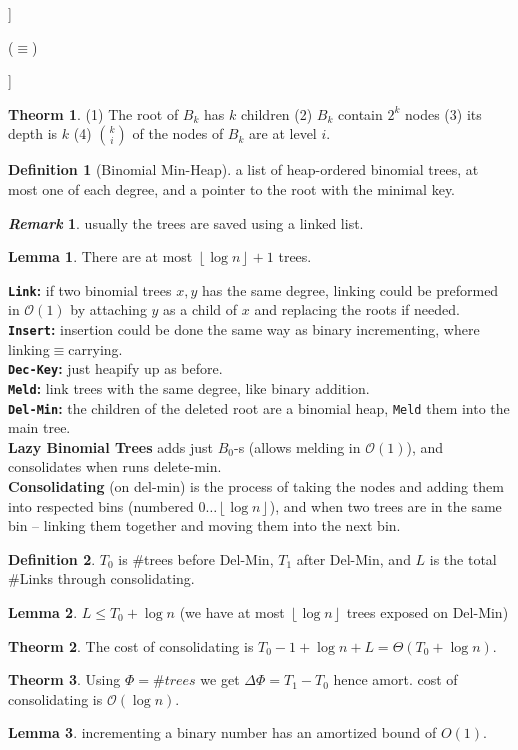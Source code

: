 \documentclass[]{article}
\theoremstyle{definition}
\newtheorem{Theorem}{\color{theoColor}Theorm}
\newtheorem{Definition}{\color{defiColor}Definition}
\newtheorem{Lemma}{\color{lemColor}Lemma}
\newtheorem{Remark}{\textit{Remark}}
\newcommand\theo  [1] {\begin{Theorem}#1\end{Theorem}}
\newcommand\defi  [1] {\begin{Definition}#1\end{Definition}}
\newcommand\lem   [1] {\begin{Lemma}#1\end{Lemma}}
\newcommand\oc    {\mathcal{O}}
\newcommand\rf    {\right\rfloor}
\newcommand\lf    {\left\lfloor}
\newcommand\floor [1] {\lf #1 \rf}
\newcommand\Dg        {\Delta}
\newcommand\logn      {\log n}
\begin{document}
\begin{multicols}{4}
{				\hfil \begin{forest}
						[$\cdot$
							[$B_0$]
							[$B_1$]
							[$\cdots$]
							[$B_{k - 1}$]
						]
				\end{forest} ($\equiv$) \begin{forest}
					[$B_{k - 1}$
						[,no edge]
						[$B_{k - 1}$]
					]
				\end{forest}}
				\vspace{36pt}
				\theo{(1) The root of $B_k$ has $k$ children (2) $B_k$ contain $2^{k}$ nodes (3) its depth is $k$ (4) $\binom{k}{i}$ of the nodes of $B_k$ are at level $i$. }
				\begin{Definition}[Binomial Min-Heap]
					a list of heap-ordered binomial trees, at most one of each degree, and a pointer to the root with the minimal key. 
				\end{Definition}
				\begin{Remark}
					usually the trees are saved using a linked list. 
				\end{Remark}
				\lem{There are at most $\floor{\logn} + 1$ trees. }
				\textbf{\texttt{Link}: }if two binomial trees $x, y$ has the same degree, linking could be preformed in $\oc(1)$ by attaching $y$ as a child of $x$ and replacing the roots if needed. \\
				\textbf{\texttt{Insert}: }insertion could be done the same way as binary incrementing, where linking$\equiv$carrying. \\
				\textbf{\texttt{Dec-Key}: }just heapify up as before. \\
				\textbf{\texttt{Meld}: }link trees with the same degree, like binary addition. \\
				\textbf{\texttt{Del-Min}: }the children of the deleted root are a binomial heap, \texttt{Meld} them into the main tree. \\
				\textbf{Lazy Binomial Trees} adds just $B_0$-s (allows melding in $\oc(1)$), and consolidates when runs delete-min. \\
				\textbf{Consolidating} (on del-min) is the process of taking the nodes and adding them into respected bins (numbered $0 \dots \floor{\logn}$), and when two trees are in the same bin -- linking them together and moving them into the next bin. 
				\defi{$T_0$ is $\#$trees before Del-Min, $T_1$ after Del-Min, and $L$ is the total $\#$Links through consolidating. }
				\lem{$L \le T_0 + \logn$ (we have at most $\floor{\logn}$ trees exposed on Del-Min)}
				\theo{The cost of consolidating is $T_0 - 1 + \logn + L = \Theta(T_0 + \logn)$. }
				\theo{Using $\Phi = \# trees$ we get $\Dg \Phi = T_1 - T_0$ hence amort. cost of consolidating is $\oc(\logn)$. }
				\lem{incrementing a binary number has an amortized bound of $O(1)$. }
			

\end{multicols}
\end{document}
